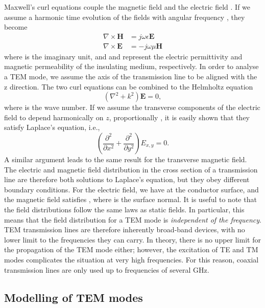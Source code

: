 Maxwell's curl equations couple the magnetic field  and
the electric field . If we assume a harmonic time
evolution of the fields with angular frequency \m{\omega}, they become
%
\begin{eqnarray}
\nabla \times \mathbf{H} &= j \omega \epsilon \mathbf{E} \\
\nabla \times \mathbf{E} &= - j\omega \mu \mathbf{H}
\end{eqnarray}
%
where  is the imaginary unit, and \m{\epsilon} and
\m{\mu} represent the electric permittivity and magnetic permeability of
the insulating medium, respectively. In order to analyse a TEM mode, we
assume the axis of the transmission line to be aligned with the z
direction. The two curl equations can be combined to the Helmholtz
equation
%
\begin{equation}
(\nabla^2+k^2) \mathbf{E}  =0,
\end{equation}
%
where  is the wave number. If we assume the
transverse components of the electric field to depend harmonically on $z$,
proportionally , it is easily shown that they
satisfy Laplace's equation, i.e.,
%
\begin{equation}
\left(\frac{\partial^2}{\partial x^2}+ \frac{\partial^2}{\partial y^2}\right) E_{x,y} = 0.
\end{equation}
A similar argument leads to the same result for the transverse magnetic
field. The electric and magnetic field distribution in the cross section
of a transmission line are therefore both solutions to Laplace's equation,
but they obey different boundary conditions.
For the electric field, we have at the
conductor surface,
and the magnetic field satisfies ,
where  is the surface normal. It is useful to note that
the field distributions follow the same laws as  static fields. In particular,
this means that the field distribution for a TEM mode is
\textit{independent of the frequency}. TEM transmission lines are therefore
inherently broad-band devices, with no lower limit to the frequencies
they can carry. In theory, there is no upper limit for the propagation
of the TEM mode either; however, the excitation of TE and TM modes
complicates the situation at very high frequencies. For this reason,
coaxial transmission lines are only used up to frequencies of several
GHz. 

\subsection{Modelling of TEM modes}\label{modelling-of-tem-modes}

